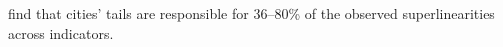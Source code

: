 %
%
%

\cite{arvidssonUrbanScalingLaws2023} find that cities’ tails are responsible for 36–80\% of the observed superlinearities across indicators. 


